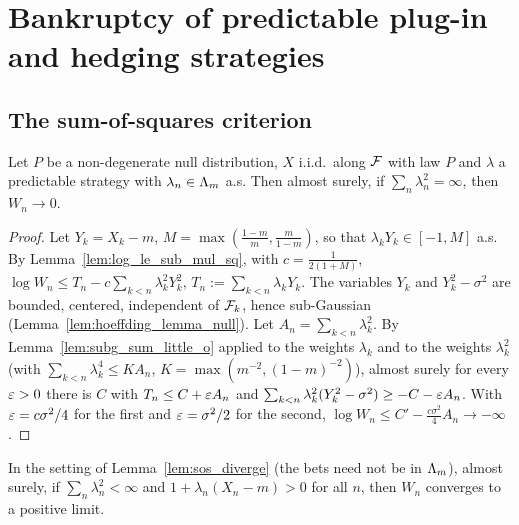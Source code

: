 \chapter{Bankruptcy of predictable plug-in and hedging strategies}
\label{chap:predictable}

\section{The sum-of-squares criterion}

\begin{lemma}
  \label{lem:sos_diverge}
  \leanok
  Let $P$ be a non-degenerate null distribution, $X$ i.i.d.\ along $\mathcal{F}$ with law $P$ and $\lambda$
  a predictable strategy with $\lambda_n \in \Lambda_m$ a.s. Then almost surely, if
  $\sum_n \lambda_n^2 = \infty$, then $W_n \to 0$.
\end{lemma}

\begin{proof}
  \leanok
  Let $Y_k = X_k - m$, $M = \max(\frac{1-m}{m}, \frac{m}{1-m})$, so that $\lambda_k Y_k \in [-1, M]$
  a.s. By Lemma~\ref{lem:log_le_sub_mul_sq}, with $c = \frac{1}{2(1+M)}$,
  $\log W_n \le T_n - c \sum_{k<n} \lambda_k^2 Y_k^2$, $T_n := \sum_{k<n} \lambda_k Y_k$. The
  variables $Y_k$ and $Y_k^2 - \sigma^2$ are bounded, centered, independent of $\mathcal{F}_k$, hence
  sub-Gaussian (Lemma~\ref{lem:hoeffding_lemma_null}). Let $A_n = \sum_{k<n}\lambda_k^2$. By
  Lemma~\ref{lem:subg_sum_little_o} applied to the weights $\lambda_k$ and to the weights
  $\lambda_k^2$ (with $\sum_{k<n} \lambda_k^4 \le K A_n$, $K = \max(m^{-2}, (1-m)^{-2})$), almost
  surely for every $\varepsilon > 0$ there is $C$ with $T_n \le C + \varepsilon A_n$ and
  $\sum_{k<n} \lambda_k^2 (Y_k^2 - \sigma^2) \ge -C - \varepsilon A_n$. With $\varepsilon = c\sigma^2/4$ for the
  first and $\varepsilon = \sigma^2/2$ for the second,
  $\log W_n \le C' - \frac{c\sigma^2}{4} A_n \to -\infty$.
\end{proof}

\begin{lemma}
  \label{lem:sos_converge}
  \leanok
  In the setting of Lemma~\ref{lem:sos_diverge} (the bets need not be in $\Lambda_m$), almost surely, if
  $\sum_n \lambda_n^2 < \infty$ and $1 + \lambda_n(X_n - m) > 0$ for all $n$, then $W_n$ converges to
  a positive limit.
\end{lemma}

